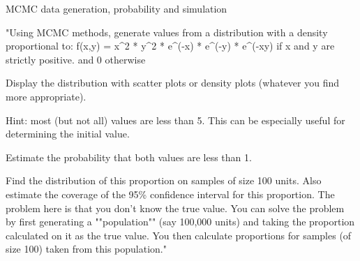 MCMC data generation, probability and simulation

"Using MCMC methods, generate values ​​from a distribution with a density proportional to:
f(x,y) = x^2 * y^2 * e^(-x) * e^(-y) * e^(-xy) if x and y are strictly positive.
and 0 otherwise

Display the distribution with scatter plots or density plots (whatever you find more appropriate).

Hint: most (but not all) values ​​are less than 5. This can be especially useful for determining the initial value.

Estimate the probability that both values ​​are less than 1.

Find the distribution of this proportion on samples of size 100 units. Also estimate the coverage of the 95\% confidence interval for this proportion. The problem here is that you don't know the true value. You can solve the problem by first generating a ""population"" (say 100,000 units) and taking the proportion calculated on it as the true value. You then calculate proportions for samples (of size 100) taken from this population."